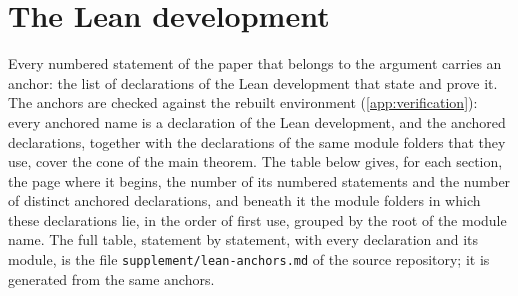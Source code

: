 \section{The Lean development}\label{app:lean}
Every numbered statement of the paper that belongs to the argument carries an anchor: the list of declarations of the Lean development that state and prove it. The anchors are checked against the rebuilt
environment (\cref{app:verification}): every anchored name is a declaration of the Lean development, and the anchored declarations, together with the declarations of the same module folders that they use, cover the
cone of the main theorem. The table below gives, for each section, the page where it begins, the number of its numbered statements and the number of distinct anchored declarations, and beneath it the module
folders in which these declarations lie, in the order of first use, grouped by the root of the module name. The full table, statement by statement, with every declaration and its module, is the file \texttt{supplement/lean-anchors.md} of the source repository;
it is generated from the same anchors.

\RPleansummary
